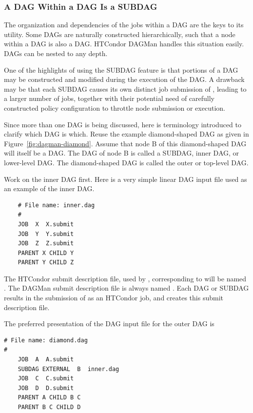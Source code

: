 \subsubsection{\label{sec:DAGsinDAGs}A DAG Within a DAG Is a SUBDAG}

The organization and dependencies of the jobs within a DAG
are the keys to its utility.
Some DAGs are naturally constructed hierarchically,
such that a node within a DAG is also a DAG.
HTCondor DAGMan handles this situation easily.
DAGs can be nested to any depth.

One of the highlights of using the SUBDAG feature is that portions of a DAG
may be constructed and modified during the execution of the DAG.
A drawback may be that each SUBDAG causes its own distinct job submission
of , leading to a larger number of jobs,
together with their potential need of carefully constructed policy configuration
to throttle node submission or execution.

Since more than one DAG is being discussed, 
here is terminology introduced to clarify which DAG is which. 
Reuse the example diamond-shaped DAG as given in 
Figure~\ref{fig:dagman-diamond}.
Assume that node B of this diamond-shaped DAG
will itself be a DAG.
The DAG of node B is called a SUBDAG, inner DAG, or lower-level DAG.
The diamond-shaped DAG is called the outer or top-level DAG.

Work on the inner DAG first.
Here is a very simple linear DAG input file used as
an example of the inner DAG.
\begin{verbatim}
    # File name: inner.dag
    #
    JOB  X  X.submit
    JOB  Y  Y.submit
    JOB  Z  Z.submit
    PARENT X CHILD Y
    PARENT Y CHILD Z
\end{verbatim}

The HTCondor submit description file, used by ,
corresponding to  will be named
.  The DAGMan submit description file is always
named .
Each DAG or SUBDAG results in the submission of 
as an HTCondor job, and  creates this
submit description file.

The preferred presentation of the DAG input file for the outer DAG is
\begin{verbatim}
# File name: diamond.dag
#
    JOB  A  A.submit 
    SUBDAG EXTERNAL  B  inner.dag
    JOB  C  C.submit	
    JOB  D  D.submit
    PARENT A CHILD B C
    PARENT B C CHILD D
\end{verbatim}

